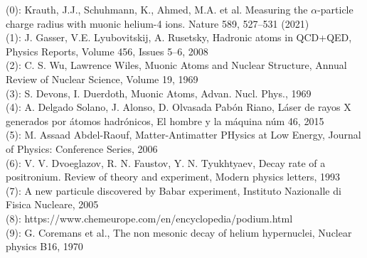 \documentclass[preview]{standalone}
\begin{document}
\begin{center}
(0): Krauth, J.J., Schuhmann, K., Ahmed, M.A. et al. Measuring the $\alpha$-particle charge radius with muonic helium-4 ions. Nature 589, 527–531 (2021)\\ (1): J. Gasser, V.E. Lyubovitskij, A. Rusetsky, Hadronic atoms in QCD+QED, Physics Reports, Volume 456, Issues 5–6, 2008\\ (2): C. S. Wu, Lawrence Wiles, Muonic Atoms and Nuclear Structure, Annual Review of Nuclear Science, Volume 19, 1969\\ (3): S. Devons, I. Duerdoth, Muonic Atoms, Advan. Nucl. Phys., 1969\\ (4): A. Delgado Solano, J. Alonso, D. Olvasada Pabón Riano, Láser de rayos X generados por átomos hadrónicos, El hombre y la máquina núm 46, 2015\\ (5): M. Assaad Abdel-Raouf, Matter-Antimatter PHysics at Low Energy, Journal of Physics: Conference Series, 2006\\ (6): V. V. Dvoeglazov, R. N. Faustov, Y. N. Tyukhtyaev, Decay rate of a positronium. Review of theory and experiment, Modern physics letters, 1993\\ (7): A new particule discovered by Babar experiment, Instituto Nazionalle di Fisica Nucleare, 2005\\ (8): https://www.chemeurope.com/en/encyclopedia/podium.html\\ (9): G. Coremans et al., The non mesonic decay of helium hypernuclei, Nuclear physics B16, 1970
\end{center}
\end{document}
